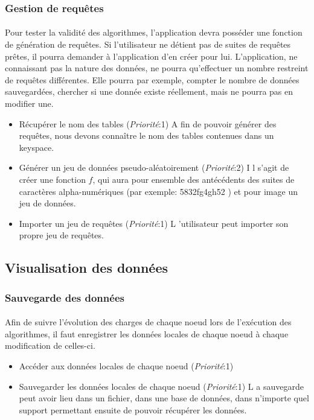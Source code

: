 \documentclass[12pt]{article}
\newenvironment{besoins}
{ \begin{itemize}[topsep=20pt]   }
{ \end{itemize}                  }
\newcommand{\priority}[1] {
  (\textit{Priorité}:#1)
}
\newcommand{\besoin}[3]{
	\item #1 \priority{#2} #3
}
\begin{document}
\subsubsection{Gestion de requêtes}

\paragraph{} Pour tester la validité des algorithmes, l'application devra posséder une fonction de génération de requêtes. 
Si l'utilisateur ne détient pas de suites de requêtes prêtes, il pourra demander à l'application d'en créer pour lui. 
L'application, ne connaissant pas la nature des données, ne pourra qu'effectuer un nombre restreint de requêtes différentes. 
Elle pourra par exemple, compter le nombre de données sauvegardées, chercher si une donnée existe réellement, mais ne pourra pas en modifier une.

\begin{besoins}
  	\besoin{Récupérer le nom des tables}{1} Afin de pouvoir générer des requêtes, nous devons connaître le nom des tables contenues dans un keyspace.
	\besoin{Générer un jeu de données pseudo-aléatoirement}{2} Il s'agit de créer une fonction $f$, qui aura pour ensemble des antécédents des suites de caractères alpha-numériques (par exemple: 5832fg4gh52 ) et pour image un jeu de données.
	\besoin{Importer un jeu de requêtes}{1} L'utilisateur peut importer son propre jeu de requêtes.
\end{besoins}


\subsection{Visualisation des données}

\subsubsection{Sauvegarde des données}

\paragraph{} Afin de suivre l'évolution des charges de chaque noeud lors de l'exécution des algorithmes, il faut enregistrer les données locales de chaque noeud à chaque modification de celles-ci.

\begin{besoins}
  \besoin{Accéder aux données locales de chaque noeud}{1}
  \besoin{Sauvegarder les données locales de chaque noeud}{1} La sauvegarde peut avoir lieu dans un fichier, dans une base de données, dans n'importe quel support permettant ensuite de pouvoir récupérer les données.
\end{besoins}
\end{document}
